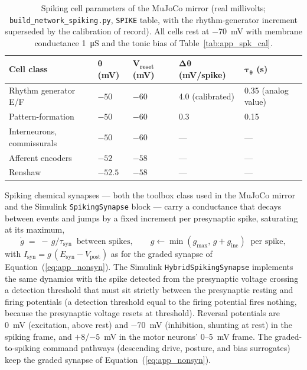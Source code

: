 \begin{table}[htbp]
\caption{Spiking cell parameters of the MuJoCo mirror (real millivolts; \texttt{build\_network\_spiking.py}, \texttt{SPIKE} table, with the rhythm-generator increment superseded by the calibration of record). All cells rest at \qty{-70}{\mV} with membrane conductance \qty{1}{\micro\siemens} and the tonic bias of Table~\ref{tab:app_spk_cal}.}
\label{tab:app_spk_cells}
\begin{tabular}{@{}lllll@{}}
\toprule
\textbf{Cell class} & $\boldsymbol{\theta}$ \textbf{(mV)} & $\boldsymbol{V_{\text{reset}}}$ \textbf{(mV)} & $\boldsymbol{\Delta\theta}$ \textbf{(mV/spike)} & $\boldsymbol{\tau_{\theta}}$ \textbf{(s)} \\
\midrule
Rhythm generator E/F & $-50$ & $-60$ & 4.0 (calibrated) & 0.35 (analog value) \\
Pattern-formation     & $-50$ & $-60$ & 0.3 & 0.15 \\
Interneurons, commissurals & $-50$ & $-60$ & --- & --- \\
Afferent encoders     & $-52$ & $-58$ & --- & --- \\
Renshaw               & $-52.5$ & $-58$ & --- & --- \\
\bottomrule
\end{tabular}
\end{table}

Spiking chemical synapses --- both the toolbox class used in the MuJoCo mirror and the Simulink \texttt{SpikingSynapse} block --- carry a conductance that decays between events and jumps by a fixed increment per presynaptic spike, saturating at its maximum,
\begin{equation}
    \dot{g} \;=\; -\,g/\tau_{\text{syn}} \;\;\text{between spikes}, 
    \qquad g \leftarrow \min\!\left(g_{\max},\, g + g_{\text{inc}}\right) \;\;\text{per spike},
    \label{eq:app_spk_syn}
\end{equation}
with $I_{\text{syn}} = g\,(E_{\text{syn}} - V_{\text{post}})$ as for the graded synapse of Equation~(\ref{eq:app_nonsyn}). The Simulink \texttt{HybridSpikingSynapse} implements the same dynamics with the spike detected from the presynaptic voltage crossing a detection threshold that must sit strictly between the presynaptic resting and firing potentials (a detection threshold equal to the firing potential fires nothing, because the presynaptic voltage resets at threshold). Reversal potentials are \qty{0}{\mV} (excitation, above rest) and \qty{-70}{\mV} (inhibition, shunting at rest) in the spiking frame, and $+8$/$-5$~mV in the motor neurons' 0--5~mV frame. The graded-to-spiking command pathways (descending drive, posture, and bias surrogates) keep the graded synapse of Equation~(\ref{eq:app_nonsyn}).

